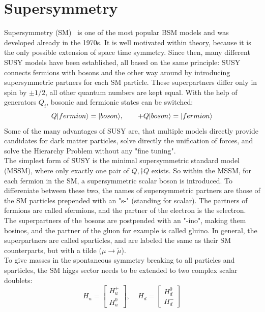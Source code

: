 \section{Supersymmetry}\label{sec:SUSY}
Supersymmetry (SM)~\cite{SUSYOriginal,SUSYPrimer} is one of the most popular BSM models and was developed already in the 1970s. It is well motivated within theory, because it is the only possible extension of space time symmetry. Since then, many different SUSY models have been established, all based on the same principle: SUSY connects fermions with bosons and the other way around by introducing supersymmetric partners for each SM particle. These superpartners differ only in spin by $\pm1/2$, all other quantum numbers are kept equal. With the help of generators $Q_i$, bosonic and fermionic states can be switched:
\begin{equation}
  Q\lvert fermion\rangle=\lvert boson\rangle,~~~~~~+ Q\lvert boson\rangle=\lvert fermion\rangle
\end{equation}
Some of the many advantages of SUSY are, that multiple models directly provide candidates for dark matter particles, solve directly the unification of forces, and solve the Hierarchy Problem without any "fine tuning".\\
The simplest form of SUSY is the minimal supersymmetric standard model (MSSM), where only exactly one pair of $Q,\dagger{Q}$ exists. So within the MSSM, for each fermion in the SM, a supersymmetric scalar boson is introduced. To differeniate between these two, the names of supersymmetric partners are those of the SM particles prepended with an "s-" (standing for scalar). The partners of fermions are called sfermions, and \eg the partner of the electron is the selectron. The superpartners of the bosons are postpended with an "-ino", making them bosinos, and the partner of the gluon for example is called gluino. In general, the superpartners are called sparticles, and are labeled the same as their SM counterparts, but with a tilde ($\mu \to \widetilde{\mu}$).\\
To give masses in the spontaneous symmetry breaking to all particles and sparticles, the SM higgs sector needs to be extended to two complex scalar doublets:
\begin{equation}
H_u=  \left[
  \begin{matrix}
    H_u^+ \\
    H_u^0
  \end{matrix}
  \right],~~~~~
  H_d=  \left[
    \begin{matrix}
      H_d^0 \\
      H_d^-
    \end{matrix}
    \right]
\end{equation}
